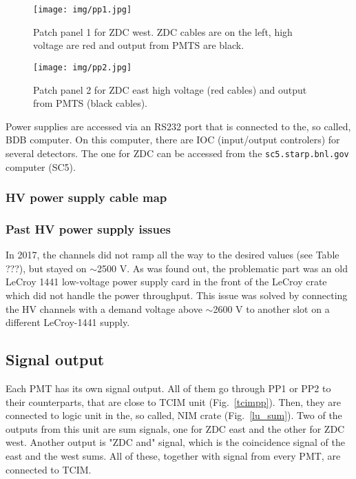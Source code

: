 \begin{figure}[htb]
\begin{center}
\texttt{[image: img/pp1.jpg]}
\end{center}
\caption{Patch panel 1 for ZDC west.  ZDC cables are on the left, high voltage are red and output from PMTS are black.}
\label{pp1}
\end{figure}

\begin{figure}[htb]
\begin{center}
\texttt{[image: img/pp2.jpg]}
\end{center}
\caption{Patch panel 2 for ZDC east high voltage (red cables) and output from PMTS (black cables).}
\label{pp2}
\end{figure}

Power supplies are accessed via an RS232 port that is connected to the, so called, BDB computer. On this computer, there are IOC (input/output controlers) for several detectors. The one for ZDC can be accessed from the \texttt{sc5.starp.bnl.gov} computer (SC5).

\subsubsection{HV power supply cable map}


\subsubsection{Past HV power supply issues}
In 2017, the channels did not ramp all the way to the desired values (see Table ???), but stayed on $\sim$2500 V\@. As was found out, the problematic part was an old LeCroy 1441 low-voltage power supply card in the front of the LeCroy crate which did not handle the power throughput. This issue was solved by connecting the HV channels with a demand voltage above $\sim$2600 V to another slot on a different
LeCroy-1441 supply.

\subsection{Signal output}

Each PMT has its own signal output. All of them go through PP1 or PP2 to their counterparts, that are close to TCIM unit (Fig.~\ref{tcimpp}). Then, they are connected to logic unit in the, so called, NIM crate (Fig.~\ref{lu_sum}). Two of the outputs from this unit are sum signals, one for ZDC east and the other for ZDC west. Another output is "ZDC and" signal, which is the coincidence signal of the east and the west sums. All of these, together with signal from every PMT, are connected to TCIM.

